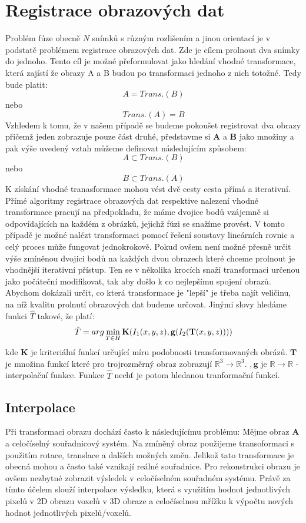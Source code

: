 \documentclass{thesis}%
\begin{document}
\chapter{Registrace obrazových dat}
Problém fúze obecně $N$ snímků s různým rozlišením a jinou orientací je v podstatě problémem registrace obrazových dat. Zde je cílem prolnout dva snímky do jednoho. Tento cíl je možné přeformulovat jako hledání vhodné transformace, která zajístí že obrazy A a B budou po transformaci jednoho z nich totožné. Tedy bude platit:\\
 $$A = Trans.(B) $$
nebo
$$ Trans.(A) = B$$
Vzhledem k tomu, že v našem případě se budeme pokoušet registrovat dva obrazy přičemž jeden zobrazuje pouze část druhé, představme si \textbf{A} a \textbf{B} jako množiny a pak výše uvedený vztah můžeme definovat následujícím způsobem:
$$A \subset Trans.(B)$$
nebo 
$$B \subset Trans.(A)$$
K získání vhodné tranasformace mohou vést dvě cesty cesta přímá a iterativní. Přímé algoritmy registrace obrazových dat respektive nalezení vhodné transformace pracují na předpokladu, že máme dvojice bodů vzájemně si odpovídajících na každém z obrázků, jejichž fúzi se snažíme provést. V tomto případě je možné nalézt transformaci pomocí řešení soustavy lineárních rovnic a celý proces může fungovat jednokrokově. Pokud ovšem není možné přesně určit výše zmíněnou dvojici bodů na každých dvou obrazech které chceme prolnout je vhodnější iterativní přístup. Ten se v několika krocích snaží transformaci určenou jako počáteční modifikovat, tak aby došlo k co nejlepšímu spojení obrazů. \\
Abychom dokázali určit, co která transformace je "lepší" je třeba najít veličinu, na níž kvalitu prolnutí obrazových dat budeme určovat. Jinými slovy hledáme funkci $\hat{T}$ takové, že platí:
\begin{equation}
 \centering
	\hat{T} = arg \min_{T \in H}\mathbf{K}(I_{1}(x,y,z),\mathbf{g}(I_{2}(\mathbf{T}(x,y,z)))) 
\end{equation}
kde $\mathbf{K}$ je kriteriální funkcí určující míru podobnosti transformovaných obrázů. $\mathbf{T}$ je množina funkcí které pro trojrozměrný obraz zobrazují $\mathbb{R}^{3}\rightarrow\mathbb{R}^{3}$. $,\mathbf{g}$ je $\mathbb{R}\rightarrow\mathbb{R}$ - interpolační funkce. Funkce $\hat{T}$ nechť je potom hledanou tranformační funkcí.\\

\section{Interpolace}
Při transformaci obrazu dochází často k následujícímu problému: Mějme obraz $\mathbf{A}$ a celočíselný souřadnicový systém. Na zmíněný obraz použijeme transoformaci s použitím rotace, translace a dalších možných změn. Jelikož tato transformace je obecná mohou a často také vznikají reálné souřadnice. Pro rekonstrukci obrazu je ovšem nezbytné zobrazit výsledek v celočíselném souřadném systému. Právě za tímto účelem slouží interpolace výsledku, která s využitím hodnot jednotlivých pixelů v 2D obrazu voxelů v 3D obraze a celočíselnou mřížku k výpočtu nových hodnot jednotlivých pixelů/voxelů.
\end{document}
